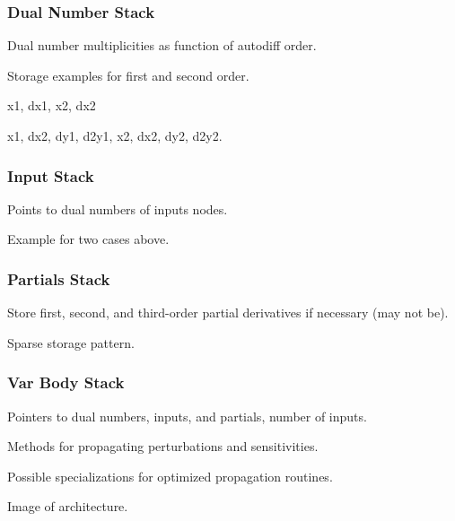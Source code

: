 \subsubsection{Dual Number Stack}

Dual number multiplicities as function of autodiff order.

Storage examples for first and second order.

x1, dx1, x2, dx2

x1, dx2, dy1, d2y1, x2, dx2, dy2, d2y2.

\subsubsection{Input Stack}

Points to dual numbers of inputs nodes.

Example for two cases above.

\subsubsection{Partials Stack}

Store first, second, and third-order partial derivatives if
necessary (may not be).

Sparse storage pattern.

\subsubsection{Var Body Stack}

Pointers to dual numbers, inputs, and partials, number of inputs.

Methods for propagating perturbations and sensitivities.

Possible specializations for optimized propagation routines.

Image of architecture.

